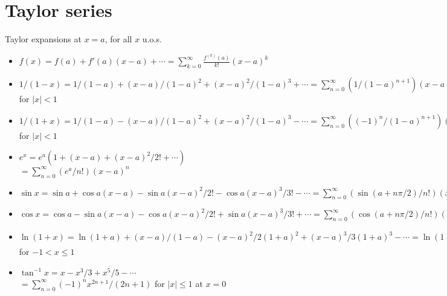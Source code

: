 \documentclass{slnotes}
\begin{document}
\section{Taylor series}
Taylor expansions at \(x = a\), for all \(x\) u.o.s.
\begin{itemize}
\item \(f(x) = f(a) + f'(a)(x-a) + \cdots = \sum^\infty_{k=0}\frac{f^{(k)}(a)}{k!}(x-a)^k\)
\item \(1/(1-x) = 1/(1-a) + (x-a)/(1-a)^2 + (x-a)^2/(1-a)^3 + \cdots = \sum^\infty_{n=0}(1/(1-a)^{n+1})(x-a)^n\) for \(\lvert x\rvert<1\)
\item \(1/(1+x) = 1/(1-a) - (x-a)/(1-a)^2 + (x-a)^2/(1-a)^3 - \cdots = \sum^\infty_{n=0}((-1)^n/(1-a)^{n+1})(x-a)^n\) for \(\lvert x\rvert<1\)
\item \(e^x = e^a(1 + (x-a) + (x-a)^2/2! + \cdots)\)\\\(= \sum^\infty_{n=0}(e^a/n!)(x-a)^n\)
\item \(\sin x = \sin a + \cos a(x-a) - \sin a(x-a)^2/2! - \cos a(x-a)^3/3! - \cdots = \sum^\infty_{n=0} (\sin(a+n\pi/2)/n!)(x-a)^n\)
\item \(\cos x = \cos a - \sin a(x-a) - \cos a(x-a)^2/2! + \sin a(x-a)^3/3! + \cdots = \sum^\infty_{n=0} (\cos(a+n\pi/2)/n!)(x-a)^n\)
\item \(\ln(1+x) = \ln(1+a) + (x-a)/(1-a) - (x-a)^2/2(1+a)^2 + (x-a)^3/3(1+a)^3 - \cdots = \ln(1+a) + \sum^\infty_{n=1} ((-1)^{n+1}/(n(1+a)^n))(x-a)^n\) for \(-1 < x \le 1\)
\item \(\tan^{-1}x = x - x^3/3 + x^5/5 - \cdots\)\\\(= \sum^\infty_{n=0} (-1)^n x^{2n+1} / (2n+1)\) for \(\lvert x\rvert\le1\) at \(x = 0\)
\end{itemize}
\end{document}
